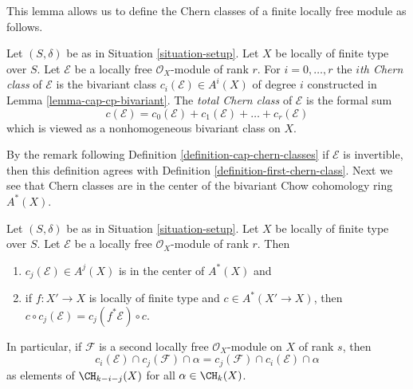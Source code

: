 \noindent
This lemma allows us to define the Chern classes of a finite
locally free module as follows.

\begin{definition}
\label{definition-chern-classes-final}
Let $(S, \delta)$ be as in Situation \ref{situation-setup}.
Let $X$ be locally of finite type over $S$.
Let $\mathcal{E}$ be a locally free $\mathcal{O}_X$-module
of rank $r$. For $i = 0, \ldots, r$ the {\it $i$th Chern class}
of $\mathcal{E}$ is the bivariant class
$c_i(\mathcal{E}) \in A^i(X)$ of degree $i$
constructed in Lemma \ref{lemma-cap-cp-bivariant}. The
{\it total Chern class} of $\mathcal{E}$ is the formal sum
$$
c(\mathcal{E}) = 
c_0(\mathcal{E}) + c_1(\mathcal{E}) + \ldots + c_r(\mathcal{E})
$$
which is viewed as a nonhomogeneous bivariant class on $X$.
\end{definition}

\noindent
By the remark following Definition \ref{definition-cap-chern-classes}
if $\mathcal{E}$ is invertible, then this definition agrees with
Definition \ref{definition-first-chern-class}.
Next we see that Chern classes are in the center of the bivariant
Chow cohomology ring $A^*(X)$.

\begin{lemma}
\label{lemma-cap-commutative-chern}
Let $(S, \delta)$ be as in Situation \ref{situation-setup}.
Let $X$ be locally of finite type over $S$.
Let $\mathcal{E}$ be a locally free $\mathcal{O}_X$-module of rank $r$.
Then
\begin{enumerate}
\item $c_j(\mathcal{E}) \in A^j(X)$ is in the center of $A^*(X)$ and
\item if $f : X' \to X$ is locally of finite type and $c \in A^*(X' \to X)$,
then $c \circ c_j(\mathcal{E}) = c_j(f^*\mathcal{E}) \circ c$.
\end{enumerate}
In particular, if $\mathcal{F}$ is a second locally free
$\mathcal{O}_X$-module on $X$ of rank $s$, then
$$
c_i(\mathcal{E}) \cap c_j(\mathcal{F}) \cap \alpha
=
c_j(\mathcal{F}) \cap c_i(\mathcal{E}) \cap \alpha
$$
as elements of $\CH_{k - i - j}(X)$ for all $\alpha \in \CH_k(X)$.
\end{lemma}

